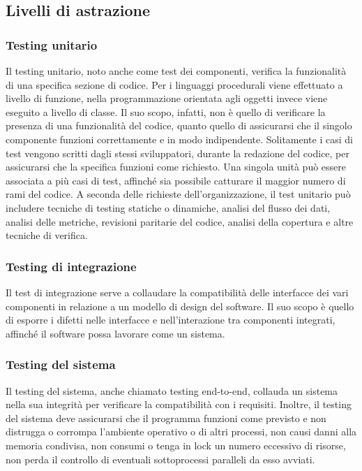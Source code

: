 \subsection{Livelli di astrazione}
\subsubsection{Testing unitario}
Il testing unitario, noto anche come test dei componenti, verifica la funzionalità di una specifica sezione di codice.
Per i linguaggi procedurali viene effettuato a livello di funzione, nella programmazione orientata agli oggetti invece viene eseguito a livello di classe. Il suo scopo, infatti, non è quello di verificare la presenza di una funzionalità del codice, quanto quello di assicurarsi che il singolo componente funzioni correttamente e in modo indipendente.
Solitamente i casi di test vengono scritti dagli stessi sviluppatori, durante la redazione del codice, per assicurarsi che la specifica funzioni come richiesto.
Una singola unità può essere associata a più casi di test, affinché sia possibile catturare il maggior numero di rami del codice.
A seconda delle richieste dell'organizzazione, il test unitario può includere tecniche di testing statiche o dinamiche, analisi del flusso dei dati, analisi delle metriche, revisioni paritarie del codice, analisi della copertura e altre tecniche di verifica.
\subsubsection{Testing di integrazione}
Il test di integrazione serve a collaudare la compatibilità delle interfacce dei vari componenti in relazione a un modello di design del software.
Il suo scopo è quello di esporre i difetti nelle interfacce e nell'interazione tra componenti integrati, affinché il software possa lavorare come un sistema.

\subsubsection{Testing del sistema}
Il testing del sistema, anche chiamato testing end-to-end, collauda un sistema nella sua integrità per verificare la compatibilità con i requisiti.
Inoltre, il testing del sistema deve assicurarsi che il programma funzioni come previsto e non distrugga o corrompa l'ambiente operativo o di altri processi, non causi danni alla memoria condivisa, non consumi o tenga in lock un numero eccessivo di risorse, non perda il controllo di eventuali sottoprocessi paralleli da esso avviati.

